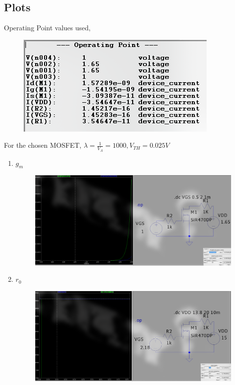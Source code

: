 \documentclass{article}
\begin{document}
\subsection{Plots}
Operating Point values used,
\begin{figure}[h!]
        \centering
        \includegraphics[width=0.7\linewidth]{figs/mosfet_op.png}
    \end{figure}
For the chosen MOSFET, $\lambda = \frac{1}{V_A} = 1000, V_{TH} = 0.025V$
\begin{enumerate}
    \item $g_m$ \begin{figure}[h!]
        \centering
        \includegraphics[width=0.9\linewidth]{figs/mosfet_gm.png}
    \end{figure}
    \pagebreak
    \item $r_0$ \begin{figure}[h!]
        \centering
        \includegraphics[width=0.9\linewidth]{figs/mosfet_r0_new.png}
    \end{figure}
\end{enumerate}
\end{document}
